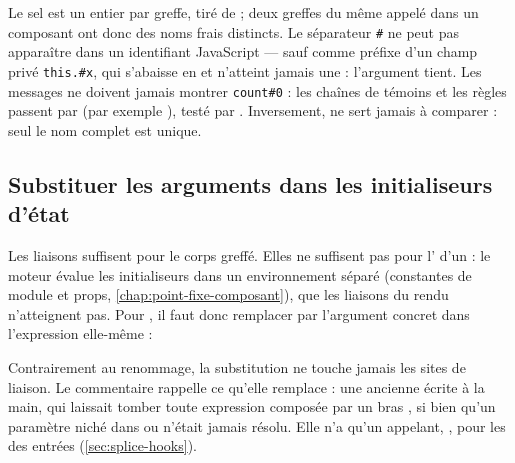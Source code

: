 
Le sel est un entier par greffe, tiré de  ; deux greffes du même appelé dans un composant ont donc des noms frais distincts. Le séparateur \texttt{\#} ne peut pas apparaître dans un identifiant JavaScript --- sauf comme préfixe d'un champ privé \texttt{this.\#x}, qui s'abaisse en  et n'atteint jamais une  : l'argument tient. Les messages ne doivent jamais montrer \texttt{count\#0} : les chaînes de témoins et les règles passent par  (par exemple ), testé par . Inversement,  ne sert jamais à comparer : seul le nom complet est unique.

\subsection{Substituer les arguments dans les initialiseurs d'état}

Les liaisons  suffisent pour le corps greffé. Elles ne suffisent pas pour l' d'un  : le moteur évalue les initialiseurs dans un environnement séparé (constantes de module et props, \cref{chap:point-fixe-composant}), que les liaisons du rendu n'atteignent pas. Pour , il faut donc remplacer  par l'argument concret  dans l'expression elle-même :


Contrairement au renommage, la substitution ne touche jamais les sites de liaison. Le commentaire rappelle ce qu'elle remplace : une ancienne  écrite à la main, qui laissait tomber toute expression composée par un bras , si bien qu'un paramètre niché dans  ou  n'était jamais résolu. Elle n'a qu'un appelant, , pour les  des entrées  (\cref{sec:splice-hooks}).

